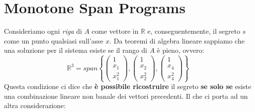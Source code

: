 \section{Monotone Span Programs}
Consideriamo ogni \textit{riga} di $A$ come vettore in $\mathbb{R}$ e, conseguentemente, il segreto $s$ come un punto qualsiasi sull'asse $x$. Da teoremi di algebra lineare sappiamo che una soluzione per il sistema esiste se il rango di $A$ è pieno, ovvero: 
\[\mathbb{R}^3=span{\left\{\left(\begin{array}{c}
  1\\
  x_1\\
  x_1^2
\end{array}\right),\left(\begin{array}{c}
  1\\
  x_2\\
  x_2^2
\end{array}\right),\left(\begin{array}{c}
  1\\
  x_4\\
  x_4^2
\end{array}\right)\right\}}\]
Questa condizione ci dice che \textbf{è possibile ricostruire} il segreto \textbf{se solo se} esiste una combinazione lineare non banale dei vettori precedenti. Il che ci porta ad un altra considerazione:

